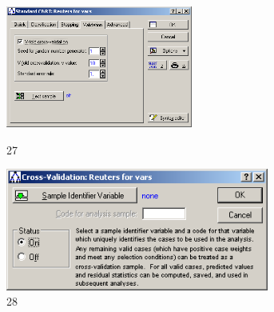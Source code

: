 \begin{figure}[!h]
  \centering

  \begin{minipage}{0.49\textwidth}
    \centering

    \includegraphics[height=4cm]
    {inc/var5/27.PNG}

    \caption{27}

    \label{fig:var5_27}
  \end{minipage}
  \begin{minipage}{0.49\textwidth}
    \centering

    \includegraphics[height=4cm]
    {inc/var5/28.PNG}

    \caption{28}

    \label{fig:var5_28}
  \end{minipage}
\end{figure}


